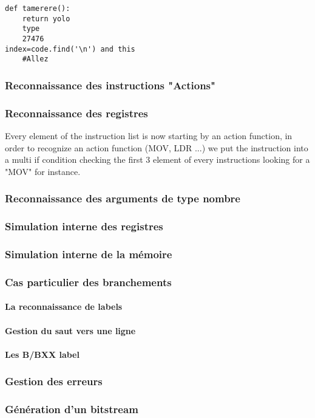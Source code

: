 \documentclass{article}
\newcommand{\n}[0]{\(\backslash\)n}
\begin{document}
\begin{lstlisting}[language=MyPython]
def tamerere():
    return yolo
    type
    27476
index=code.find('\n') and this
    #Allez
\end{lstlisting}


\subsubsection{Reconnaissance des instructions "Actions"}
\subsubsection{Reconnaissance des registres}
Every element of the instruction list is now starting by an action function, in order to recognize an action function (MOV, LDR ...) we put the instruction into a multi if condition checking the first 3 element of every instructions looking for a "MOV" for instance.
\subsubsection{Reconnaissance des arguments de type nombre}
\subsubsection{Simulation interne des registres}
\subsubsection{Simulation interne de la mémoire}
\subsubsection{Cas particulier des branchements}
\paragraph{La reconnaissance de labels}
\paragraph{Gestion du saut vers une ligne}
\paragraph{Les B/BXX label}
\subsubsection{Gestion des erreurs}
\subsubsection{Génération d'un bitstream}
\end{document}
